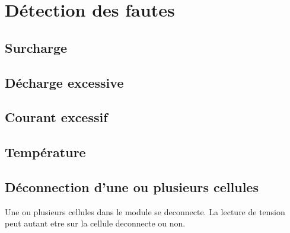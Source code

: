 
\section{D\'{e}tection des fautes}
	\subsection{Surcharge}
	
	\subsection{D\'{e}charge excessive}
	
	\subsection{Courant excessif}
	
	\subsection{Temp\'{e}rature}
	
	\subsection{D\'{e}connection d'une ou plusieurs cellules}
		Une ou plusieurs cellules dans le module se deconnecte. La lecture de tension peut autant etre sur la cellule deconnecte ou non.
	\subsection{}
	
	\subsection{}
	
	\subsection{}
	
	\subsection{}
	
	\subsection{}
	
	\subsection{}
	
